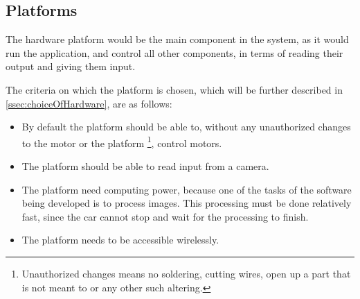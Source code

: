 \subsection{Platforms}\label{ssec:platforms}
The hardware platform would be the main component in the system, as it would run the application, and control all other components, in terms of reading their output and giving them input.

The criteria on which the platform is chosen, which will be further described in \autoref{ssec:choiceOfHardware}, are as follows:
\begin{itemize}
  \item By default the platform should be able to, without any unauthorized changes to the motor or the platform \footnote{Unauthorized changes means no soldering, cutting wires, open up a part that is not meant to or any other such altering.}, control motors.
  \item The platform should be able to read input from a camera.
  \item The platform need computing power, because one of the tasks of the software being developed is to process images.
  This processing must be done relatively fast, since the car cannot stop and wait for the processing to finish.
  \item The platform needs to be accessible wirelessly.
\end{itemize}

